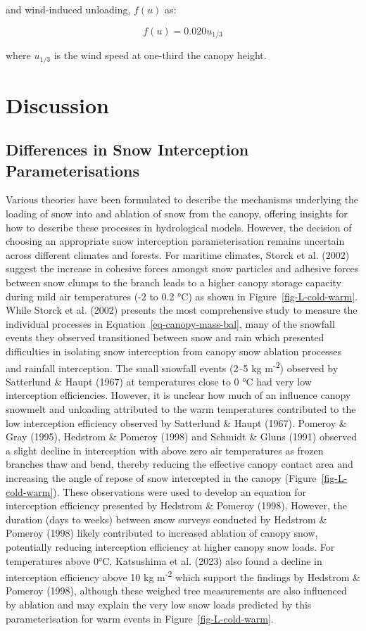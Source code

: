 \documentclass[
  letterpaper,
]{tex/uofsthesis-cs}
\begin{document}
and wind-induced unloading, \(f(u)\) as:

\[
f(u) = 0.020u_{1/3}
\]

where \(u_{1/3}\) is the wind speed at one-third the canopy height.

\section{Discussion}\label{discussion}

\subsection{Differences in Snow Interception
Parameterisations}\label{differences-in-snow-interception-parameterisations}

Various theories have been formulated to describe the mechanisms
underlying the loading of snow into and ablation of snow from the
canopy, offering insights for how to describe these processes in
hydrological models. However, the decision of choosing an appropriate
snow interception parameterisation remains uncertain across different
climates and forests. For maritime climates, Storck et al. (2002)
suggest the increase in cohesive forces amongst snow particles and
adhesive forces between snow clumps to the branch leads to a higher
canopy storage capacity during mild air temperatures (-2 to 0.2 °C) as
shown in Figure~\ref{fig-L-cold-warm}. While Storck et al. (2002)
presents the most comprehensive study to measure the individual
processes in Equation~\ref{eq-canopy-mass-bal}, many of the snowfall
events they observed transitioned between snow and rain which presented
difficulties in isolating snow interception from canopy snow ablation
processes and rainfall interception. The small snowfall events (2--5 kg
m\textsuperscript{-2}) observed by Satterlund \& Haupt (1967) at
temperatures close to 0 °C had very low interception efficiencies.
However, it is unclear how much of an influence canopy snowmelt and
unloading attributed to the warm temperatures contributed to the low
interception efficiency observed by Satterlund \& Haupt (1967). Pomeroy
\& Gray (1995), Hedstrom \& Pomeroy (1998) and Schmidt \& Gluns (1991)
observed a slight decline in interception with above zero air
temperatures as frozen branches thaw and bend, thereby reducing the
effective canopy contact area and increasing the angle of repose of snow
intercepted in the canopy (Figure~\ref{fig-L-cold-warm}). These
observations were used to develop an equation for interception
efficiency presented by Hedstrom \& Pomeroy (1998). However, the
duration (days to weeks) between snow surveys conducted by Hedstrom \&
Pomeroy (1998) likely contributed to increased ablation of canopy snow,
potentially reducing interception efficiency at higher canopy snow
loads. For temperatures above 0°C, Katsushima et al. (2023) also found a
decline in interception efficiency above 10 kg m\textsuperscript{-2}
which support the findings by Hedstrom \& Pomeroy (1998), although these
weighed tree measurements are also influenced by ablation and may
explain the very low snow loads predicted by this parameterisation for
warm events in Figure~\ref{fig-L-cold-warm}.
\end{document}
